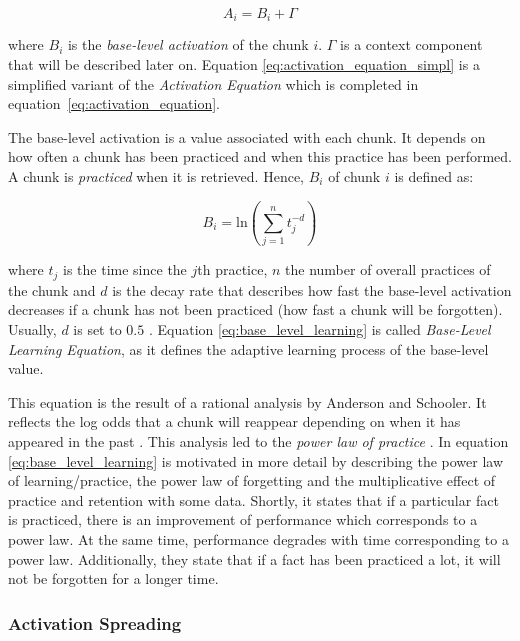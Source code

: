 \begin{equation}
 \label{eq:activation_equation_simpl}
 A_i = B_i + \Gamma
\end{equation}

where $B_i$ is the \emph{base-level activation} of the chunk $i$. $\Gamma$ is a context component that will be described later on. Equation \eqref{eq:activation_equation_simpl} is a simplified variant of the \emph{Activation Equation} which is completed in equation~\eqref{eq:activation_equation}.

The base-level activation is a value associated with each chunk. It depends on how often a chunk has been practiced and when this practice has been performed. A chunk is \emph{practiced} when it is retrieved. Hence, $B_i$ of chunk $i$ is defined as:

\begin{equation}
\label{eq:base_level_learning}
B_i = \mathrm{ln}\left(\sum_{j=1}^n{t_j^{-d}}\right)
\end{equation}

where $t_j$ is the time since the $j$th practice, $n$ the number of overall practices of the chunk and $d$ is the decay rate that describes how fast the base-level activation decreases if a chunk has not been practiced (how fast a chunk will be forgotten). Usually, $d$ is set to $0.5$ \cite[p. 1042]{anderson_integrated_2004}. Equation \eqref{eq:base_level_learning} is called \emph{Base-Level Learning Equation}, as it defines the adaptive learning process of the base-level value.

This equation is the result of a rational analysis by Anderson and Schooler. It reflects the log odds that a chunk will reappear depending on when it has appeared in the past \cite[33]{taatgen_modeling_2006}. This analysis led to the \emph{power law of practice} \cite[1042]{anderson_integrated_2004}. In \cite[8--11]{anderson_implications_2000} equation \eqref{eq:base_level_learning} is motivated in more detail by describing the power law of learning/practice, the power law of forgetting and the multiplicative effect of practice and retention with some data. Shortly, it states that if a particular fact is practiced, there is an improvement of performance which corresponds to a power law. At the same time, performance degrades with time corresponding to a power law. Additionally, they state that if a fact has been practiced a lot, it will not be forgotten for a longer time.

\subsubsection{Activation Spreading}

